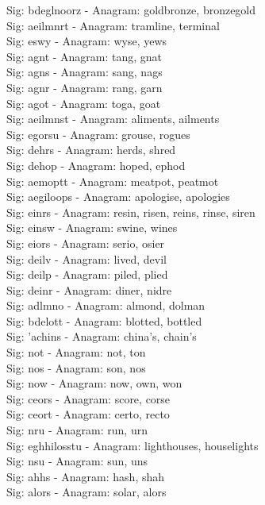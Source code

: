 Sig: {bdeglnoorz} - Anagram: goldbronze, bronzegold \\
Sig: {aeilmnrt} - Anagram: tramline, terminal \\
Sig: {eswy} - Anagram: wyse, yews \\
Sig: {agnt} - Anagram: tang, gnat \\
Sig: {agns} - Anagram: sang, nags \\
Sig: {agnr} - Anagram: rang, garn \\
Sig: {agot} - Anagram: toga, goat \\
Sig: {aeilmnst} - Anagram: aliments, ailments \\
Sig: {egorsu} - Anagram: grouse, rogues \\
Sig: {dehrs} - Anagram: herds, shred \\
Sig: {dehop} - Anagram: hoped, ephod \\
Sig: {aemoptt} - Anagram: meatpot, peatmot \\
Sig: {aegiloops} - Anagram: apologise, apologies \\
Sig: {einrs} - Anagram: resin, risen, reins, rinse, siren \\
Sig: {einsw} - Anagram: swine, wines \\
Sig: {eiors} - Anagram: serio, osier \\
Sig: {deilv} - Anagram: lived, devil \\
Sig: {deilp} - Anagram: piled, plied \\
Sig: {deinr} - Anagram: diner, nidre \\
Sig: {adlmno} - Anagram: almond, dolman \\
Sig: {bdelott} - Anagram: blotted, bottled \\
Sig: {'achins} - Anagram: china's, chain's \\
Sig: {not} - Anagram: not, ton \\
Sig: {nos} - Anagram: son, nos \\
Sig: {now} - Anagram: now, own, won \\
Sig: {ceors} - Anagram: score, corse \\
Sig: {ceort} - Anagram: certo, recto \\
Sig: {nru} - Anagram: run, urn \\
Sig: {eghhilosstu} - Anagram: lighthouses, houselights \\
Sig: {nsu} - Anagram: sun, uns \\
Sig: {ahhs} - Anagram: hash, shah \\
Sig: {alors} - Anagram: solar, alors \\

